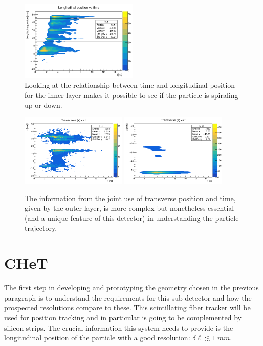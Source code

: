 \begin{refsection}
        \begin{figure}
            \centering
            \includegraphics[width=0.5\textwidth]{Figures/muEDM/Tracker/fPosInYfTimeIn.png}
            \caption{Looking at the relationship between time and longitudinal position for the inner layer makes it possible to see if the particle is spiraling up or down.}
        \label{fig:geant4_time_pos}
        \end{figure}

        \begin{figure}
            \centering
            \includegraphics[width=0.45\textwidth]{Figures/muEDM/Tracker/fPosInXfTimeIn.png}
            \includegraphics[width=0.45\textwidth]{Figures/muEDM/Tracker/fPosInZfTimeIn.png}
            \caption{The information from the joint use of transverse position and time, given by the outer layer, is more complex but nonetheless essential (and a unique feature of this detector) in understanding the particle trajectory.}
        \label{fig:geant4_time_pos_transverse}
        \end{figure}

\section{CHeT}
    The first step in developing and prototyping the geometry chosen in the previous paragraph is to understand the requirements for this sub-detector and how the prospected resolutions compare to these.
    This scintillating fiber tracker will be used for position tracking and in particular is going to be complemented by silicon strips. The crucial information this system needs to provide is the longitudinal position of the particle with a good resolution: $\delta \ell \lesssim \SI{1}{mm}$.


\end{refsection}
